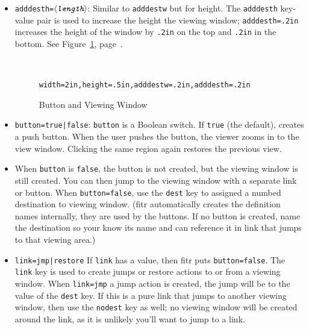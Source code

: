 \documentclass{article}
\def\meta#1{$\langle\textit{\texttt{#1}}\rangle$}
\def\fitrpkg{\textsf{f{i}tr}}
\begin{document}
\begin{itemize}
\item \texttt{adddesth=\meta{length}}: Similar to \texttt{adddestw} but for height.
The \texttt{adddesth}
key-value pair is used to increase the height the viewing window; \texttt{adddesth=.2in}
increases the height of the window by \texttt{.2in} on the top and \texttt{.2in} in the bottom.
See Figure~\ref*{bvw}, page~\pageref*{bvw}.
\begin{figure}[htb]
\begin{center}\setlength\fboxsep{0pt}
   \fbox{\parbox[c][.9in]{2.4in}
        {\vfill\hfil\fbox{\parbox[c][.5in]{2in}{\hfill\vfill}}\hfil\vfill}}\\[4pt]
        \caption{Button and Viewing Window}\label{bvw}
        {\small\texttt{width=2in,height=.5in,adddestw=.2in,adddesth=.2in}}
\end{center}
\end{figure}

\item \texttt{button=true|false}: \texttt{button} is a Boolean switch.
    If \texttt{true} (the default),  creates a push button.
    When the user pushes the button, the viewer zooms in to the view
    window. Clicking the same region again restores the previous view.

\item[] When \texttt{button} is \texttt{false}, the button is not created,
but the viewing window is still created. You can then jump to the viewing
window with a separate link or button. When \texttt{button=false}, use the
\texttt{dest} key to assigned a numbed destination to viewing window.
({\fitrpkg} automatically creates the definition names internally, they
are used by the buttons. If no button is created, name the destination so
your know its name and can reference it in link that jumps to that viewing
area.)


\item \texttt{link=jmp|restore} If \texttt{link} has a value, then
    {\fitrpkg} puts \texttt{button=false}. The \texttt{link} key is
    used to create jumps or restore actions to or from a viewing
    window. When \texttt{link=jmp} a jump action is created, the jump
    will be to the value of the \texttt{dest} key. If this is a pure
    link that jumps to another viewing window, then use the
    \texttt{nodest} key as well; no viewing window will be created
    around the link, as it is unlikely you'll want to jump to a link.


\end{itemize}
\end{document}
